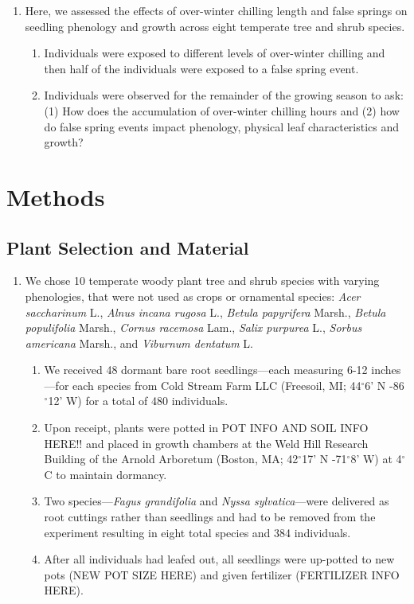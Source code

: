 \documentclass{article}\usepackage[]{graphicx}\usepackage[]{color}
\begin{document}
\begin{enumerate}
\item Here, we assessed the effects of over-winter chilling length and false springs on seedling phenology and growth across eight temperate tree and shrub species. 
  \begin{enumerate}
  \item Individuals were exposed to different levels of over-winter chilling and then half of the individuals were exposed to a false spring event. 
  \item Individuals were observed for the remainder of the growing season to ask: (1) How does the accumulation of over-winter chilling hours and (2) how do false spring events impact phenology, physical leaf characteristics and growth?
  \end{enumerate}
\end{enumerate}
  

\section*{Methods}
\subsection*{Plant Selection and Material}
\begin{enumerate}
\item We chose 10 temperate woody plant tree and shrub species with varying phenologies, that were not used as crops or ornamental species: \textit{Acer saccharinum} L., \textit{Alnus incana rugosa} L., \textit{Betula papyrifera} Marsh., \textit{Betula populifolia} Marsh., \textit{Cornus racemosa} Lam., \textit{Salix purpurea} L., \textit{Sorbus americana} Marsh., and \textit{Viburnum dentatum} L.
  \begin{enumerate}
  \item We received 48 dormant bare root seedlings---each measuring 6-12 inches---for each species from Cold Stream Farm LLC (Freesoil, MI; 44$^{\circ}$6' N -86$^{\circ}$12' W) for a total of 480 individuals.
  \item Upon receipt, plants were potted in POT INFO AND SOIL INFO HERE!! and placed in growth chambers at the Weld Hill Research Building of the Arnold Arboretum (Boston, MA; 42$^{\circ}$17' N -71$^{\circ}$8' W) at 4$^{\circ}$C to maintain dormancy.
  \item Two species---\textit{Fagus grandifolia} and \textit{Nyssa sylvatica}---were delivered as root cuttings rather than seedlings and had to be removed from the experiment resulting in eight total species and 384 individuals.
  \item After all individuals had leafed out, all seedlings were up-potted to new pots (NEW POT SIZE HERE) and given fertilizer (FERTILIZER INFO HERE).
  \end{enumerate}
\end{enumerate}
\end{document}
